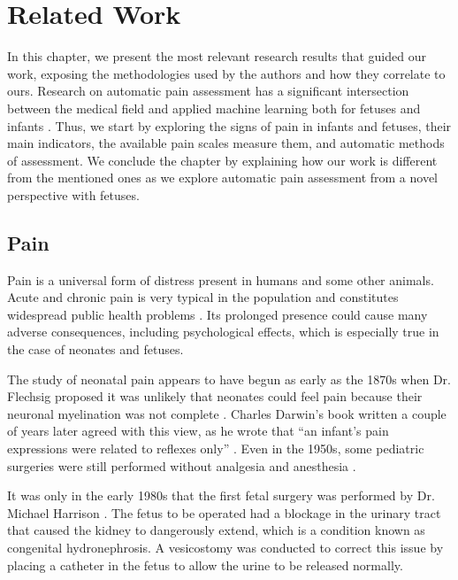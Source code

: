 \chapter{Related Work}

In this chapter, we present the most relevant research results that guided our work, exposing the methodologies used by the authors and how they correlate to ours. Research on automatic pain assessment has a significant intersection between the medical field and applied machine learning both for fetuses and infants \citep{ZamzmiPGKSA16, Bellieni2012}. Thus, we start by exploring the signs of pain in infants and fetuses, their main indicators, the available pain scales measure them, and automatic methods of assessment. We conclude the chapter by explaining how our work is different from the mentioned ones as we explore automatic pain assessment from a novel perspective with fetuses.

\section{Pain}

Pain is a universal form of distress present in humans and some other animals. Acute and chronic pain is very typical in the population and constitutes widespread public health problems \citep{Goldberg2011}. Its prolonged presence could cause many adverse consequences, including psychological effects, which is especially true in the case of neonates and fetuses.

The study of neonatal pain appears to have begun as early as the 1870s when Dr. Flechsig proposed it was unlikely that neonates could feel pain because their neuronal myelination was not complete \citep{cope1998neonatal}. Charles Darwin's book written a couple of years later agreed with this view, as he wrote that ``an infant's pain expressions were related to reflexes only'' \citep{darwin1872expression}. Even in the 1950s, some pediatric surgeries were still performed without analgesia and anesthesia \citep{cope1998neonatal}.

It was only in the early 1980s that the first fetal surgery was performed by Dr. Michael Harrison \citep{Harrison1982}. The fetus to be operated had a blockage in the urinary tract that caused the kidney to dangerously extend, which is a condition known as congenital hydronephrosis. A vesicostomy was conducted to correct this issue by placing a catheter in the fetus to allow the urine to be released normally.

